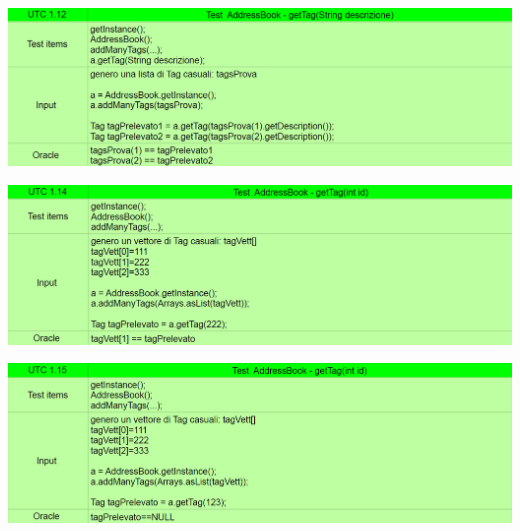 \begin{center} \includegraphics[width=\linewidth]{images/UTC/1-12.png} \end{center}
\begin{center} \includegraphics[width=\linewidth]{images/UTC/1-14.png} \end{center}
\begin{center} \includegraphics[width=\linewidth]{images/UTC/1-15.png} \end{center}
